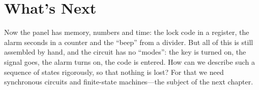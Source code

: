 \section{What's Next}

Now the panel has memory, numbers and time: the lock code in a register, the alarm
seconds in a counter and the ``beep'' from a divider. But all of this is still
assembled by hand, and the circuit has no ``modes'': the key is turned on, the signal
goes, the alarm turns on, the code is entered. How can we describe such a sequence
of states rigorously, so that nothing is lost? For that we need synchronous circuits
and finite-state machines---the subject of the next chapter.
